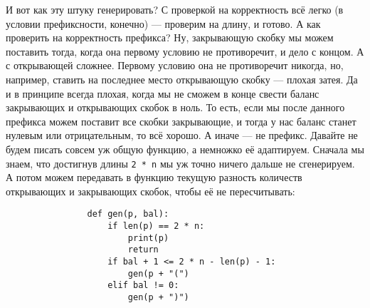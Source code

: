 \documentclass{article}
\begin{document}
\begin{itemize}
\begin{Comment}
            И вот как эту штуку генерировать? С проверкой на корректность всё легко (в условии префиксности, конечно) --- проверим на длину, и готово. А как проверить на корректность префикса? Ну, закрывающую скобку мы можем поставить тогда, когда она первому условию не противоречит, и дело с концом. А с открывающей сложнее. Первому условию она не противоречит никогда, но, например, ставить на последнее место открывающую скобку --- плохая затея. Да и в принципе всегда плохая, когда мы не сможем в конце свести баланс закрывающих и открывающих скобок в ноль. То есть, если мы после данного префикса можем поставит все скобки закрывающие, и тогда у нас баланс станет нулевым или отрицательным, то всё хорошо. А иначе --- не префикс. Давайте не будем писать совсем уж общую функцию, а немножко её адаптируем. Сначала мы знаем, что достигнув длины \texttt{2 * n} мы уж точно ничего дальше не сгенерируем. А потом можем передавать в функцию текущую разность количеств открывающих и закрывающих скобок, чтобы её не пересчитывать:
            \begin{verbatim}
                def gen(p, bal):
                    if len(p) == 2 * n:
                        print(p)
                        return
                    if bal + 1 <= 2 * n - len(p) - 1:
                        gen(p + "(")
                    elif bal != 0:
                        gen(p + ")")


\end{verbatim}
\end{Comment}
\end{itemize}
\end{document}
